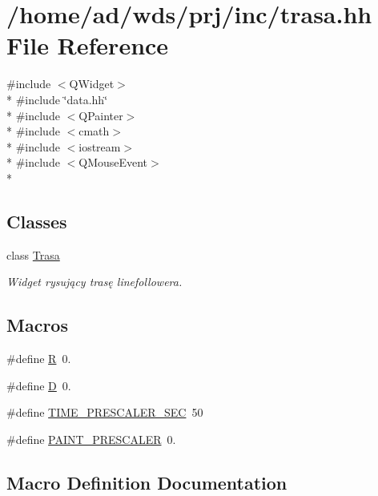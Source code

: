 \hypertarget{trasa_8hh}{}\section{/home/ad/wds/prj/inc/trasa.hh File Reference}
\label{trasa_8hh}
{\ttfamily \#include $<$Q\+Widget$>$}\\*
{\ttfamily \#include \char`\"{}data.\+hh\char`\"{}}\\*
{\ttfamily \#include $<$Q\+Painter$>$}\\*
{\ttfamily \#include $<$cmath$>$}\\*
{\ttfamily \#include $<$iostream$>$}\\*
{\ttfamily \#include $<$Q\+Mouse\+Event$>$}\\*
\subsection*{Classes}
\begin{DoxyCompactItemize}
\item 
class \hyperlink{class_trasa}{Trasa}
\begin{DoxyCompactList}\small\item\em Widget rysujący trasę linefollowera. \end{DoxyCompactList}\end{DoxyCompactItemize}
\subsection*{Macros}
\begin{DoxyCompactItemize}
\item 
\#define \hyperlink{trasa_8hh_a5c71a5e59a53413cd6c270266d63b031}{R}~0.
\item 
\#define \hyperlink{trasa_8hh_af316c33cc298530f245e8b55330e86b5}{D}~0.
\item 
\#define \hyperlink{trasa_8hh_a84f58a271e6d602a7f75debc82eb7951}{T\+I\+M\+E\+\_\+\+P\+R\+E\+S\+C\+A\+L\+E\+R\+\_\+\+S\+EC}~50
\item 
\#define \hyperlink{trasa_8hh_a54aee68ea5d21c1ff7999b13f3fb58e2}{P\+A\+I\+N\+T\+\_\+\+P\+R\+E\+S\+C\+A\+L\+ER}~0.
\end{DoxyCompactItemize}


\subsection{Macro Definition Documentation}
